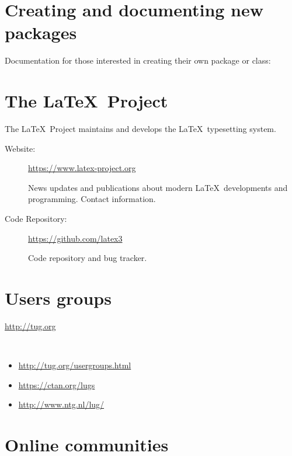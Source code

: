 \documentclass{article}
\def\TeX{TeX}%
\def\LaTeX{LaTeX}%
\renewcommand*{\TeX}{TeX}
\renewcommand*{\LaTeX}{LaTeX}
\begin{document}
\section{Creating and documenting new packages}

Documentation for those interested in creating their own package or class:

\printbibliography[
    heading=none,
    category=creating,
]


\section{The \LaTeX\ Project}

The \LaTeX\ Project maintains and develops the \LaTeX\ typesetting system.

\begin{description}
\item[Website:] \url{https://www.latex-project.org}

    News updates and publications about modern \LaTeX\ developments and programming.
    Contact information.
    
\item[Code Repository:] \url{https://github.com/latex3}

    Code repository and bug tracker.
\end{description}


\section{Users groups}
\label{sec:groups}

\begin{description}[style=unboxed]
\item[\TeX\ Users Group:] \url{http://tug.org}
\item[Lists of international users groups:] \
    \begin{itemize}
    \item \url{http://tug.org/usergroups.html}
    \item \url{https://ctan.org/lugs}
    \item \url{http://www.ntg.nl/lug/}
    \end{itemize}
\end{description}

\section{Online communities}
\label{sec:online}
\end{document}
